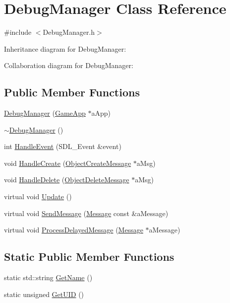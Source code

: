 \hypertarget{classDebugManager}{}\section{Debug\+Manager Class Reference}
\label{classDebugManager}


{\ttfamily \#include $<$Debug\+Manager.\+h$>$}



Inheritance diagram for Debug\+Manager\+:


Collaboration diagram for Debug\+Manager\+:
\subsection*{Public Member Functions}
\begin{DoxyCompactItemize}
\item 
\hyperlink{classDebugManager_ae54ad99eb4a750a811de2268e4e126d2}{Debug\+Manager} (\hyperlink{classGameApp}{Game\+App} $\ast$a\+App)
\item 
\hyperlink{classDebugManager_acc6abe356ece9ec1a3f78b9161dd4e3e}{$\sim$\+Debug\+Manager} ()
\item 
int \hyperlink{classDebugManager_ae3936b1e73ba65ee4a7c9930b56f8ec4}{Handle\+Event} (S\+D\+L\+\_\+\+Event \&event)
\item 
void \hyperlink{classDebugManager_ab72b08cee02c75870ab6e26aa7cc7f82}{Handle\+Create} (\hyperlink{classObjectCreateMessage}{Object\+Create\+Message} $\ast$a\+Msg)
\item 
void \hyperlink{classDebugManager_a3ebe379f0a35108252f81cf7a385198e}{Handle\+Delete} (\hyperlink{classObjectDeleteMessage}{Object\+Delete\+Message} $\ast$a\+Msg)
\item 
virtual void \hyperlink{classDebugManager_ac38c481d6098016147998e4600d1fbbf}{Update} ()
\item 
virtual void \hyperlink{classDebugManager_a75c0d45e3ad7eb78e39c70176be8b49c}{Send\+Message} (\hyperlink{classMessage}{Message} const \&a\+Message)
\item 
virtual void \hyperlink{classDebugManager_ade321538ddc51cadbbd9624ce6c0628d}{Process\+Delayed\+Message} (\hyperlink{classMessage}{Message} $\ast$a\+Message)
\end{DoxyCompactItemize}
\subsection*{Static Public Member Functions}
\begin{DoxyCompactItemize}
\item 
static std\+::string \hyperlink{classDebugManager_a0c4d82216d587db620c4ae46fd138ca3}{Get\+Name} ()
\item 
static unsigned \hyperlink{classDebugManager_a99c1d8e25153ba19a1b841fc37cbc665}{Get\+U\+ID} ()
\end{DoxyCompactItemize}
